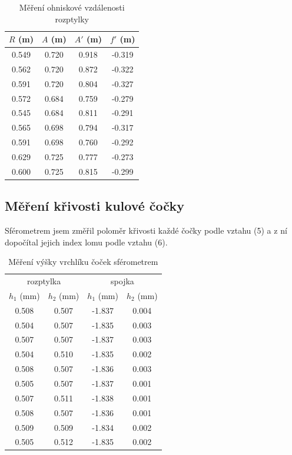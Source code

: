 \documentclass[a4paper,11pt]{article}
\begin{document}
\vspace{-10pt}

\begin{table}[htpb]
    \centering
    \begin{tabular}{ccc | c}
        $ R $ (m) & $ A $ (m) & $ A' $ (m) & $ f' $ (m)  \\ \hline 
        0.549 & 0.720 & 0.918 & -0.319 \\
        0.562 & 0.720 & 0.872 & -0.322 \\
        0.591 & 0.720 & 0.804 & -0.327 \\
        0.572 & 0.684 & 0.759 & -0.279 \\
        0.545 & 0.684 & 0.811 & -0.291 \\
        0.565 & 0.698 & 0.794 & -0.317 \\
        0.591 & 0.698 & 0.760 & -0.292 \\
        0.629 & 0.725 & 0.777 & -0.273 \\
        0.600 & 0.725 & 0.815 & -0.299 \\
    \end{tabular}
    \caption{Měření ohniskové vzdálenosti rozptylky}
\end{table}

\subsection{Měření křivosti kulové čočky}

Sférometrem jsem změřil poloměr křivosti každé čočky podle vztahu (5) a z ní dopočítal jejich index lomu podle vztahu (6).

\begin{table}[htpb]
    \centering
    \begin{tabular}{cc|cc}
        \hline\hline
        \multicolumn{2}{c|}{rozptylka} & \multicolumn{2}{c}{spojka} \\
        $ h_1 $ (mm) & $ h_2 $ (mm) & $ h_1 $ (mm) & $ h_2 $ (mm)  \\ \hline 
        0.508 & 0.507 & -1.837 & 0.004 \\
        0.504 & 0.507 & -1.835 & 0.003 \\
        0.507 & 0.507 & -1.837 & 0.003 \\
        0.504 & 0.510 & -1.835 & 0.002 \\
        0.508 & 0.507 & -1.836 & 0.003 \\
        0.505 & 0.507 & -1.837 & 0.001 \\
        0.507 & 0.511 & -1.838 & 0.001 \\
        0.508 & 0.507 & -1.836 & 0.001 \\
        0.509 & 0.509 & -1.834 & 0.002 \\
        0.505 & 0.512 & -1.835 & 0.002 \\
        \hline\hline
    \end{tabular}
    \caption{Měření výšky vrchlíku čoček sférometrem}
\end{table}
\end{document}
